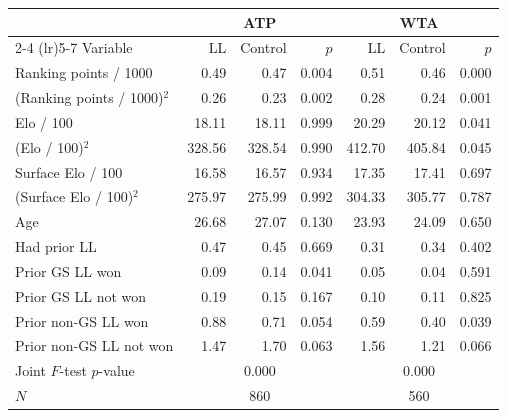 \begin{tabular}{l rrr rrr}
\toprule
 & \multicolumn{3}{c}{ATP} & \multicolumn{3}{c}{WTA} \\
\cmidrule(lr){2-4} \cmidrule(lr){5-7}
Variable & LL & Control & $p$ & LL & Control & $p$ \\
\midrule
Ranking points / 1000 & 0.49 & 0.47 & 0.004 & 0.51 & 0.46 & 0.000 \\
(Ranking points / 1000)$^2$ & 0.26 & 0.23 & 0.002 & 0.28 & 0.24 & 0.001 \\
Elo / 100 & 18.11 & 18.11 & 0.999 & 20.29 & 20.12 & 0.041 \\
(Elo / 100)$^2$ & 328.56 & 328.54 & 0.990 & 412.70 & 405.84 & 0.045 \\
Surface Elo / 100 & 16.58 & 16.57 & 0.934 & 17.35 & 17.41 & 0.697 \\
(Surface Elo / 100)$^2$ & 275.97 & 275.99 & 0.992 & 304.33 & 305.77 & 0.787 \\
Age & 26.68 & 27.07 & 0.130 & 23.93 & 24.09 & 0.650 \\
Had prior LL & 0.47 & 0.45 & 0.669 & 0.31 & 0.34 & 0.402 \\
Prior GS LL won & 0.09 & 0.14 & 0.041 & 0.05 & 0.04 & 0.591 \\
Prior GS LL not won & 0.19 & 0.15 & 0.167 & 0.10 & 0.11 & 0.825 \\
Prior non-GS LL won & 0.88 & 0.71 & 0.054 & 0.59 & 0.40 & 0.039 \\
Prior non-GS LL not won & 1.47 & 1.70 & 0.063 & 1.56 & 1.21 & 0.066 \\
\midrule
Joint $F$-test $p$-value & \multicolumn{3}{c}{0.000} & \multicolumn{3}{c}{0.000} \\
$N$ & \multicolumn{3}{c}{860} & \multicolumn{3}{c}{560} \\
\bottomrule
\end{tabular}
